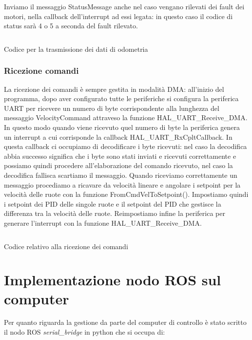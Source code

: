 Inviamo il messaggio StatusMessage anche nel caso vengano rilevati dei fault dei motori, nella callback dell'interrupt ad essi legata: in questo caso il codice di status sarà 4 o 5 a seconda del fault rilevato.


\begin{listing}[ht]
\inputminted[frame=single,framesep=10pt]{cpp}{codice/dma_tx_code.cpp}
\caption{Codice per la trasmissione dei dati di odometria}
\label{listing:trasmissione_dati}
\end{listing}


\subsubsection{Ricezione comandi}
La ricezione dei comandi è sempre gestita in modalità DMA: all'inizio del programma, dopo aver configurato tutte le periferiche si configura la periferica UART per ricevere un numero di byte corrispondente alla lunghezza del messaggio VelocityCommand attraveso la funzione HAL\_UART\_Receive\_DMA. In questo modo quando viene ricevuto quel numero di byte la periferica genera un interrupt a cui corrisponde la callback HAL\_UART\_RxCpltCallback.
In questa callback ci occupiamo di decodificare i byte ricevuti: nel caso la decodifica abbia successo significa che i byte sono stati inviati e ricevuti correttamente e possiamo quindi procedere all'elaborazione del comando ricevuto, nel caso la decodifica fallisca scartiamo il messaggio.
Quando riceviamo correttamente un messaggio procediamo a ricavare da velocità lineare e angolare i setpoint per la velocità delle ruote con la funzione FromCmdVelToSetpoint(). Impostiamo quindi i setpoint dei PID delle singole ruote e il setpoint del PID che gestisce la differenza tra la velocità delle ruote.
Reimpostiamo infine la periferica per generare l'interrupt con la funzione HAL\_UART\_Receive\_DMA.


\begin{listing}[ht]
\inputminted[frame=single,framesep=10pt]{cpp}{codice/dma_rx_code.cpp}
\caption{Codice relativo alla ricezione dei comandi}
\label{listing:ricezione_dati}
\end{listing}


\section{Implementazione nodo ROS sul computer}
Per quanto riguarda la gestione da parte del computer di controllo è stato scritto il nodo ROS \textit{serial\_bridge} in python che si occupa di:

